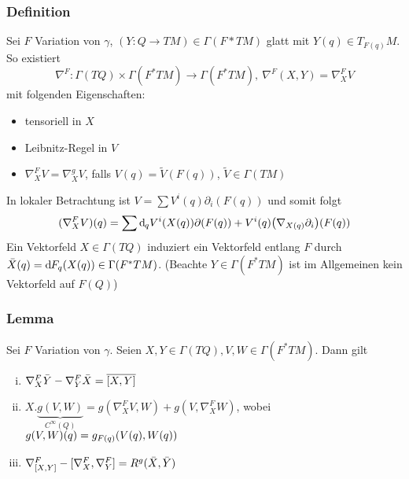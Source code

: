 \subsubsection{Definition}
\label{ssub:234}
Sei $F$ Variation von $\gamma$, $(Y:Q\to TM) \in \Gamma(F*TM)$ glatt mit $Y(q) \in T_{F(q)}M$. So existiert 
\[
\nabla^F:\Gamma(TQ)\times \Gamma(F^* TM) \to \Gamma(F^* TM),\ \nabla^F (X,Y) = \nabla_X^F V
\]
mit folgenden Eigenschaften:
\begin{itemize}
\item tensoriell in $X$
\item Leibnitz-Regel in $V$
\item $\nabla_X^F V = \nabla_X^g V$, falls $V(q) = \tilde{V}(F(q))$, $\tilde{V}\in \Gamma(TM)$
\end{itemize}
In lokaler Betrachtung ist $V = \sum V^i(q) \partial_i(F(q))$ und somit folgt 
\[
(\nabla_X^F V)(q) = \sum \mathd_q V^i(X(q))\partial(F(q))+V^i(q)\enbrace*{\nabla_{X(q)}\partial_i}(F(q))
\]
Ein Vektorfeld $X\in \Gamma(TQ)$ induziert ein Vektorfeld entlang $F$ durch  $\bar{X}(q) = \mathrm{d}\mkern-1.0mu F_q(X(q))\in \Gamma(F^* TM)$. (Beachte $Y\in \Gamma(F^* TM)$ ist im Allgemeinen kein Vektorfeld auf $F(Q)$)

\subsubsection{Lemma}
\label{ssub:235}
Sei $F$ Variation von $\gamma$. Seien $X,Y\in \Gamma(TQ), V,W\in \Gamma(F^* TM)$. Dann gilt
\begin{enumerate}[(i)]
\item $\nabla_X^F \bar{Y} - \nabla_Y^F \bar{X} = \overline{[X,Y]}$
\item $X.\underbrace{g(V,W)}_{C^\infty (Q)} = g(\nabla_X^F V,W) + g(V,\nabla_X^F W)$, wobei $g(V,W)(q) = g_{F(q)}(V(q),W(q))$
\item $\nabla_{[X,Y]}^F - [\nabla_X^F,\nabla_Y^F] = R^g(\bar{X},\bar{Y})$
\end{enumerate}

